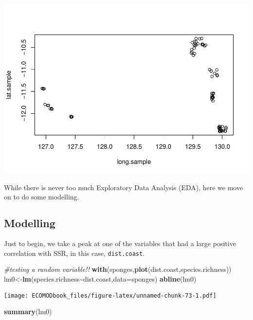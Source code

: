 \documentclass[
]{book}
\newenvironment{Shaded}{\begin{snugshade}}{\end{snugshade}}
\newcommand{\AttributeTok}[1]{\textcolor[rgb]{0.13,0.29,0.53}{#1}}
\newcommand{\CommentTok}[1]{\textcolor[rgb]{0.56,0.35,0.01}{\textit{#1}}}
\newcommand{\FunctionTok}[1]{\textcolor[rgb]{0.13,0.29,0.53}{\textbf{#1}}}
\newcommand{\NormalTok}[1]{#1}
\newcommand{\OtherTok}[1]{\textcolor[rgb]{0.56,0.35,0.01}{#1}}
\newcommand{\SpecialCharTok}[1]{\textcolor[rgb]{0.81,0.36,0.00}{\textbf{#1}}}
\begin{document}
\includegraphics{ECOMODbook_files/figure-latex/unnamed-chunk-72-1.pdf}

While there is never too much Exploratory Data Analysis (EDA), here we move on to do some modelling.

\hypertarget{modelling}{%
\subsection{Modelling}\label{modelling}}

Just to begin, we take a peak at one of the variables that had a large positive correlation with SSR, in this case, \texttt{dist.coast}.

\begin{Shaded}
\begin{Highlighting}[]
\CommentTok{\#testing a random variable!!}
\FunctionTok{with}\NormalTok{(sponges,}\FunctionTok{plot}\NormalTok{(dist.coast,species.richness))}
\NormalTok{lm0}\OtherTok{\textless{}{-}}\FunctionTok{lm}\NormalTok{(species.richness}\SpecialCharTok{\textasciitilde{}}\NormalTok{dist.coast,}\AttributeTok{data=}\NormalTok{sponges)}
\FunctionTok{abline}\NormalTok{(lm0)}
\end{Highlighting}
\end{Shaded}

\texttt{[image: ECOMODbook\_files/figure-latex/unnamed-chunk-73-1.pdf]}

\begin{Shaded}
\begin{Highlighting}[]
\FunctionTok{summary}\NormalTok{(lm0)}
\end{Highlighting}
\end{Shaded}
\end{document}
